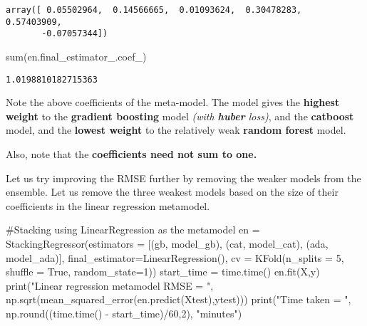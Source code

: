 \documentclass[
  letterpaper,
  DIV=11,
  numbers=noendperiod]{scrreprt}
\newenvironment{Shaded}{\begin{snugshade}}{\end{snugshade}}
\newcommand{\BuiltInTok}[1]{\textcolor[rgb]{0.00,0.23,0.31}{#1}}
\newcommand{\CommentTok}[1]{\textcolor[rgb]{0.37,0.37,0.37}{#1}}
\newcommand{\DecValTok}[1]{\textcolor[rgb]{0.68,0.00,0.00}{#1}}
\newcommand{\NormalTok}[1]{\textcolor[rgb]{0.00,0.23,0.31}{#1}}
\newcommand{\OperatorTok}[1]{\textcolor[rgb]{0.37,0.37,0.37}{#1}}
\newcommand{\StringTok}[1]{\textcolor[rgb]{0.13,0.47,0.30}{#1}}
\newcommand{\VariableTok}[1]{\textcolor[rgb]{0.07,0.07,0.07}{#1}}
\begin{document}
\begin{verbatim}
array([ 0.05502964,  0.14566665,  0.01093624,  0.30478283,  0.57403909,
       -0.07057344])
\end{verbatim}

\begin{Shaded}
\begin{Highlighting}[]
\BuiltInTok{sum}\NormalTok{(en.final\_estimator\_.coef\_)}
\end{Highlighting}
\end{Shaded}

\begin{verbatim}
1.0198810182715363
\end{verbatim}

Note the above coefficients of the meta-model. The model gives the
\textbf{highest weight} to the \textbf{gradient boosting} model
\emph{(with \textbf{huber} loss)}, and the \textbf{catboost} model, and
the \textbf{lowest weight} to the relatively weak \textbf{random forest}
model.

Also, note that the \textbf{coefficients need not sum to one.}

Let us try improving the RMSE further by removing the weaker models from
the ensemble. Let us remove the three weakest models based on the size
of their coefficients in the linear regression metamodel.

\begin{Shaded}
\begin{Highlighting}[]
\CommentTok{\#Stacking using LinearRegression as the metamodel}
\NormalTok{en }\OperatorTok{=}\NormalTok{ StackingRegressor(estimators }\OperatorTok{=}\NormalTok{ [(}\StringTok{\textquotesingle{}gb\textquotesingle{}}\NormalTok{, model\_gb), (}\StringTok{\textquotesingle{}cat\textquotesingle{}}\NormalTok{, model\_cat), (}\StringTok{\textquotesingle{}ada\textquotesingle{}}\NormalTok{, model\_ada)],}
\NormalTok{                     final\_estimator}\OperatorTok{=}\NormalTok{LinearRegression(),                                          }
\NormalTok{                    cv }\OperatorTok{=}\NormalTok{ KFold(n\_splits }\OperatorTok{=} \DecValTok{5}\NormalTok{, shuffle }\OperatorTok{=} \VariableTok{True}\NormalTok{, random\_state}\OperatorTok{=}\DecValTok{1}\NormalTok{))}
\NormalTok{start\_time }\OperatorTok{=}\NormalTok{ time.time()}
\NormalTok{en.fit(X,y)}
\BuiltInTok{print}\NormalTok{(}\StringTok{"Linear regression metamodel RMSE = "}\NormalTok{, np.sqrt(mean\_squared\_error(en.predict(Xtest),ytest)))}
\BuiltInTok{print}\NormalTok{(}\StringTok{"Time taken = "}\NormalTok{, np.}\BuiltInTok{round}\NormalTok{((time.time() }\OperatorTok{{-}}\NormalTok{ start\_time)}\OperatorTok{/}\DecValTok{60}\NormalTok{,}\DecValTok{2}\NormalTok{), }\StringTok{"minutes"}\NormalTok{)}
\end{Highlighting}
\end{Shaded}
\end{document}

